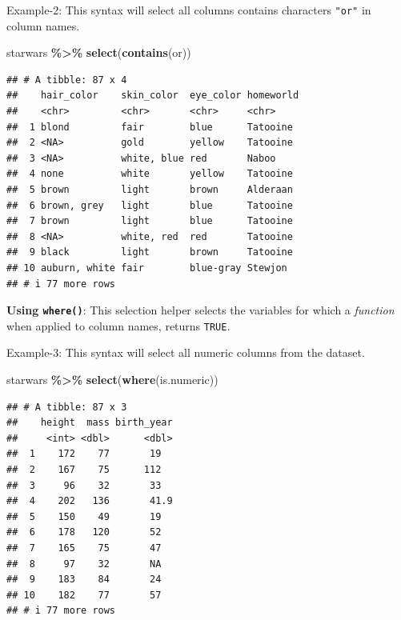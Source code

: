 \documentclass[
]{book}
\newenvironment{Shaded}{\begin{snugshade}}{\end{snugshade}}
\newcommand{\FunctionTok}[1]{\textcolor[rgb]{0.13,0.29,0.53}{\textbf{#1}}}
\newcommand{\NormalTok}[1]{#1}
\newcommand{\SpecialCharTok}[1]{\textcolor[rgb]{0.81,0.36,0.00}{\textbf{#1}}}
\newcommand{\StringTok}[1]{\textcolor[rgb]{0.31,0.60,0.02}{#1}}
\begin{document}
Example-2: This syntax will select all columns contains characters \texttt{"or"} in column names.

\begin{Shaded}
\begin{Highlighting}[]
\NormalTok{starwars }\SpecialCharTok{\%\textgreater{}\%} 
  \FunctionTok{select}\NormalTok{(}\FunctionTok{contains}\NormalTok{(}\StringTok{\textquotesingle{}or\textquotesingle{}}\NormalTok{))}
\end{Highlighting}
\end{Shaded}

\begin{verbatim}
## # A tibble: 87 x 4
##    hair_color    skin_color  eye_color homeworld
##    <chr>         <chr>       <chr>     <chr>    
##  1 blond         fair        blue      Tatooine 
##  2 <NA>          gold        yellow    Tatooine 
##  3 <NA>          white, blue red       Naboo    
##  4 none          white       yellow    Tatooine 
##  5 brown         light       brown     Alderaan 
##  6 brown, grey   light       blue      Tatooine 
##  7 brown         light       blue      Tatooine 
##  8 <NA>          white, red  red       Tatooine 
##  9 black         light       brown     Tatooine 
## 10 auburn, white fair        blue-gray Stewjon  
## # i 77 more rows
\end{verbatim}

\textbf{Using \texttt{where()}}: This selection helper selects the variables for which a \emph{function} when applied to column names, returns \texttt{TRUE}.

Example-3: This syntax will select all numeric columns from the dataset.

\begin{Shaded}
\begin{Highlighting}[]
\NormalTok{starwars }\SpecialCharTok{\%\textgreater{}\%} 
  \FunctionTok{select}\NormalTok{(}\FunctionTok{where}\NormalTok{(is.numeric))}
\end{Highlighting}
\end{Shaded}

\begin{verbatim}
## # A tibble: 87 x 3
##    height  mass birth_year
##     <int> <dbl>      <dbl>
##  1    172    77       19  
##  2    167    75      112  
##  3     96    32       33  
##  4    202   136       41.9
##  5    150    49       19  
##  6    178   120       52  
##  7    165    75       47  
##  8     97    32       NA  
##  9    183    84       24  
## 10    182    77       57  
## # i 77 more rows
\end{verbatim}
\end{document}
